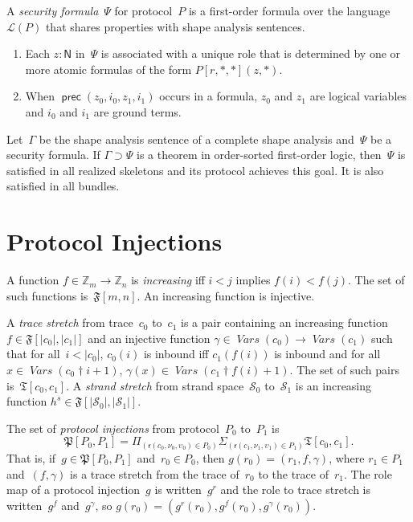 \documentclass[12pt]{article}
\newcommand{\cn}[1]{\ensuremath{\operatorname{\mathsf{#1}}}}
\newcommand{\fn}[1]{\ensuremath{\operatorname{\mathit{#1}}}}
\newcommand{\srt}[1]{\ensuremath{\mathsf{#1}}}
\newcommand{\typ}{\mathbin:}
\newcommand{\vars}{\fn{Vars}}
\newcommand{\prefix}[2]{#1\dagger#2}
\newcommand{\zed}{\ensuremath{\mathbb{Z}}}
\newcommand{\dprod}[1]{\Pi_{(#1)}}
\newcommand{\dpair}[1]{\Sigma_{(#1)}}
\newcommand{\alg}[1]{\ensuremath{\mathfrak{#1}}}
\newcommand{\ssp}{\ensuremath{\mathcal{S}}}
\newcommand{\lang}{\mathcal{L}}
\newcommand{\role}{\mathsf{r}}
\begin{document}
A \emph{security formula}~$\Psi$ for protocol~$P$ is a first-order
formula over the language~$\lang(P)$ that shares properties with shape
analysis sentences.
\begin{enumerate}
\item Each $z\typ\srt{N}$ in~$\Psi$ is associated with a unique role
  that is determined by one or more atomic formulas of the form
  $P[r,\ast,\ast](z,\ast)$.
\item When $\cn{prec}(z_0,i_0,z_1,i_1)$ occurs in a formula, $z_0$ and
  $z_1$ are logical variables and $i_0$ and $i_1$ are ground terms.
\end{enumerate}

Let~$\Gamma$ be the shape analysis sentence of a complete shape
analysis and~$\Psi$ be a security formula.  If $\Gamma\supset\Psi$ is a
theorem in order-sorted first-order logic, then~$\Psi$ is satisfied in
all realized skeletons and its protocol achieves this goal.  It is
also satisfied in all bundles.

\section{Protocol Injections}\label{sec:protocol injections}

A function $f\in\zed_m\to\zed_n$ is \emph{increasing} iff $i<j$
implies $f(i)<f(j)$.  The set of such functions is~$\alg{F}[m,n]$.  An
increasing function is injective.

A \emph{trace stretch} from trace~$c_0$ to~$c_1$ is a pair containing
an increasing function $f\in\alg{F}[|c_0|, |c_1|]$ and an injective
function $\gamma\in\vars(c_0)\to\vars(c_1)$ such that for
all~$i<|c_0|$, $c_0(i)$ is inbound iff $c_1(f(i))$ is inbound and for
all $x\in\vars(\prefix{c_0}{i+1})$,
$\gamma(x)\in\vars(\prefix{c_1}{f(i)+1})$.  The set of such pairs
is~$\alg{T}[c_0,c_1]$.  A \emph{strand stretch} from strand
space~$\ssp_0$ to~$\ssp_1$ is an increasing function
$h^s\in\alg{F}[|\ssp_0|, |\ssp_1|]$.

The set of \emph{protocol injections} from protocol~$P_0$ to~$P_1$ is
\[\alg{P}[P_0,P_1]=\dprod{\role(c_0,\nu_0,\upsilon_0)\in
  P_0}\dpair{\role(c_1,\nu_1,\upsilon_1)\in P_1}\alg{T}[c_0,c_1].\]
That is, if~$g\in\alg{P}[P_0,P_1]$ and~$r_0\in P_0$, then
$g(r_0)=(r_1,f,\gamma)$, where $r_1\in P_1$ and~$(f,\gamma)$ is a
trace stretch from the trace of~$r_0$ to the trace of~$r_1$.  The role
map of a protocol injection~$g$ is written~$g^r$ and the role to trace
stretch is written~$g^f$ and~$g^\gamma$, so $g(r_0)=(g^r(r_0),
g^f(r_0),g^\gamma(r_0))$.
\end{document}
